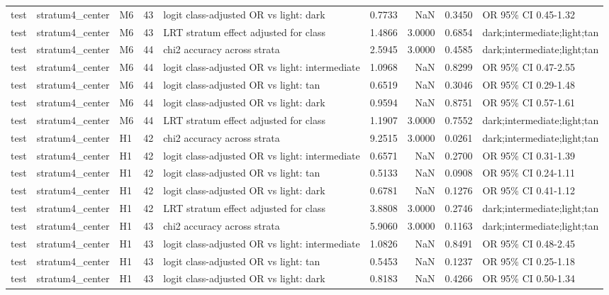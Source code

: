 \begin{tabular}{lllrlrrrl}
test & stratum4\_center & M6 & 43 & logit class-adjusted OR vs light: dark & 0.7733 & NaN & 0.3450 & OR 95\% CI 0.45-1.32 \\
test & stratum4\_center & M6 & 43 & LRT stratum effect adjusted for class & 1.4866 & 3.0000 & 0.6854 & dark;intermediate;light;tan \\
test & stratum4\_center & M6 & 44 & chi2 accuracy across strata & 2.5945 & 3.0000 & 0.4585 & dark;intermediate;light;tan \\
test & stratum4\_center & M6 & 44 & logit class-adjusted OR vs light: intermediate & 1.0968 & NaN & 0.8299 & OR 95\% CI 0.47-2.55 \\
test & stratum4\_center & M6 & 44 & logit class-adjusted OR vs light: tan & 0.6519 & NaN & 0.3046 & OR 95\% CI 0.29-1.48 \\
test & stratum4\_center & M6 & 44 & logit class-adjusted OR vs light: dark & 0.9594 & NaN & 0.8751 & OR 95\% CI 0.57-1.61 \\
test & stratum4\_center & M6 & 44 & LRT stratum effect adjusted for class & 1.1907 & 3.0000 & 0.7552 & dark;intermediate;light;tan \\
test & stratum4\_center & H1 & 42 & chi2 accuracy across strata & 9.2515 & 3.0000 & 0.0261 & dark;intermediate;light;tan \\
test & stratum4\_center & H1 & 42 & logit class-adjusted OR vs light: intermediate & 0.6571 & NaN & 0.2700 & OR 95\% CI 0.31-1.39 \\
test & stratum4\_center & H1 & 42 & logit class-adjusted OR vs light: tan & 0.5133 & NaN & 0.0908 & OR 95\% CI 0.24-1.11 \\
test & stratum4\_center & H1 & 42 & logit class-adjusted OR vs light: dark & 0.6781 & NaN & 0.1276 & OR 95\% CI 0.41-1.12 \\
test & stratum4\_center & H1 & 42 & LRT stratum effect adjusted for class & 3.8808 & 3.0000 & 0.2746 & dark;intermediate;light;tan \\
test & stratum4\_center & H1 & 43 & chi2 accuracy across strata & 5.9060 & 3.0000 & 0.1163 & dark;intermediate;light;tan \\
test & stratum4\_center & H1 & 43 & logit class-adjusted OR vs light: intermediate & 1.0826 & NaN & 0.8491 & OR 95\% CI 0.48-2.45 \\
test & stratum4\_center & H1 & 43 & logit class-adjusted OR vs light: tan & 0.5453 & NaN & 0.1237 & OR 95\% CI 0.25-1.18 \\
test & stratum4\_center & H1 & 43 & logit class-adjusted OR vs light: dark & 0.8183 & NaN & 0.4266 & OR 95\% CI 0.50-1.34 \\

\end{tabular}
